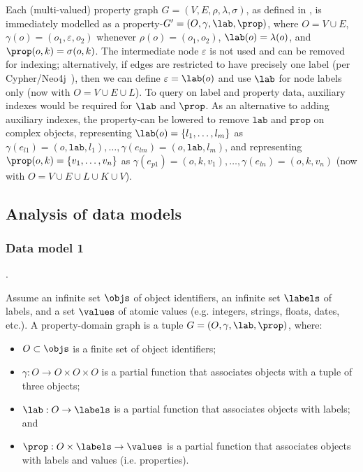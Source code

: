 Each (multi-valued) property graph $G = (V,E,\rho,\lambda,\sigma)$, as defined in \cite{AnglesABHRV17}, is immediately modelled as a property-\data $G' = (O,\gamma,\lab,\prop)$, where $O = V\cup E$,  $\gamma(o) = (o_1,\varepsilon,o_2)$ whenever $\rho(o) = (o_1,o_2)$, $\lab(o) = \lambda(o)$, and $\prop(o,k)=\sigma(o,k)$. The intermediate node $\varepsilon$ is not used and can be removed for indexing; alternatively, if edges are restricted to have precisely one label (per Cypher/Neo4j~\cite{FrancisGGLLMPRS18}), then we can define $\varepsilon = \lab(o)$ and use $\lab$ for node labels only (now with $O = V\cup E \cup L$). To query on label and property data, auxiliary indexes would be required for $\lab$ and $\prop$. As an alternative to adding auxiliary indexes, the property-\data can be lowered to remove $\texttt{lab}$ and $\texttt{prop}$ on complex objects, representing $\lab(o) = \{ l_1,\ldots,l_m \}$ as $\gamma(e_{l1}) = (o,\texttt{lab},l_1), \ldots, \gamma(e_{lm}) = (o,\texttt{lab},l_m)$, and representing $\prop(o,k) = \{ v_1,\ldots,v_n \}$ as $\gamma(e_{p1}) = (o,k,v_1), \ldots, \gamma(e_{ln}) = (o,k,v_n)$ (now with $O = V\cup E \cup L \cup K \cup V$).


\subsection{Analysis of data models}
\label{sec-models}

\subsubsection{Data model 1}.

Assume an infinite set $\objs$ of object identifiers, an infinite set $\labels$ of labels, and a set $\values$ of atomic values  (e.g. integers, strings, floats, dates, etc.). 
A property-domain graph is a tuple $G=(O,\gamma,\lab,\prop)$, where:
\begin{itemize}
\item $O \subset \objs$ is a finite set of object identifiers;
\item $\gamma : O \to O \times O \times O$ is a partial function that associates objects with a tuple of three objects; 
\item $\lab : O \to \labels$ is a partial function that associates objects with labels; and
\item $\prop : O \times \labels \to \values$ is a partial function that associates objects with labels and values (i.e. properties).
\end{itemize}

